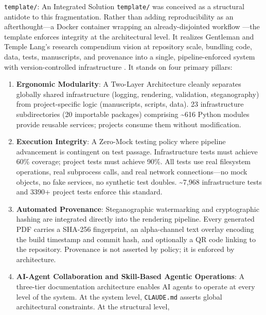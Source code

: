 \documentclass[
  ignorenonframetext,
]{beamer}
\begin{document}
\begin{frame}{\texttt{template/}: An
Integrated Solution}
\protect{}\label{template-an-integrated-solution}
\texttt{template/} was conceived as a structural antidote to this
fragmentation. Rather than adding reproducibility as an afterthought---a
Docker container wrapping an already-disjointed workflow
---the template enforces integrity at the
architectural level. It realizes Gentleman and Temple Lang's research
compendium vision  at repository scale,
bundling code, data, tests, manuscripts, and provenance into a single,
pipeline-enforced system with version-controlled infrastructure
. It stands on four primary pillars:

\begin{enumerate}
\item
  \textbf{Ergonomic Modularity}: A Two-Layer Architecture cleanly
  separates globally shared infrastructure (logging, rendering,
  validation, steganography) from project-specific logic (manuscripts,
  scripts, data). 23 infrastructure subdirectories (20 importable
  packages) comprising \textasciitilde616 Python modules provide
  reusable services; projects consume them without modification.
\item
  \textbf{Execution Integrity}: A Zero-Mock testing policy where
  pipeline advancement is contingent on test passage. Infrastructure
  tests must achieve 60\% coverage; project tests must achieve 90\%. All
  tests use real filesystem operations, real subprocess calls, and real
  network connections---no mock objects, no fake services, no synthetic
  test doubles. \textasciitilde7,968 infrastructure tests and 3390+
  project tests enforce this standard.
\item
  \textbf{Automated Provenance}: Steganographic watermarking and
  cryptographic hashing are integrated directly into the rendering
  pipeline. Every generated PDF carries a SHA-256 fingerprint, an
  alpha-channel text overlay encoding the build timestamp and commit
  hash, and optionally a QR code linking to the repository. Provenance
  is not asserted by policy; it is enforced by architecture.
\item
  \textbf{AI-Agent Collaboration and Skill-Based Agentic Operations}: A
  three-tier documentation architecture enables AI agents to operate at
  every level of the system. At the system level, \texttt{CLAUDE.md}
  asserts global architectural constraints. At the structural level,

\end{enumerate}
\end{frame}
\end{document}
